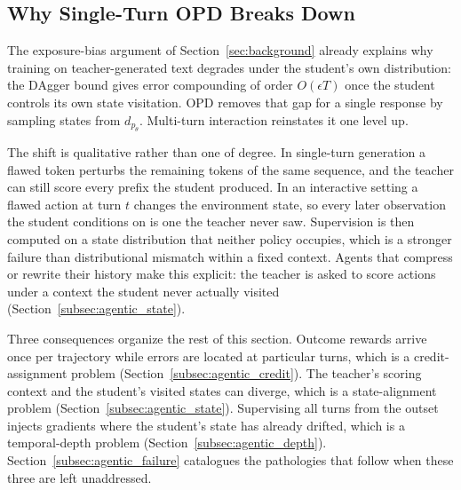 \documentclass{article} %
\newcommand{\ptheta}{p_\theta}
\begin{document}
\subsection{Why Single-Turn OPD Breaks Down}
\label{subsec:agentic_why}

The exposure-bias argument of Section~\ref{sec:background} already explains why training on teacher-generated text degrades under the student's own distribution: the DAgger bound gives error compounding of order $O(\epsilon T)$ once the student controls its own state visitation. OPD removes that gap for a single response by sampling states from $d_{\ptheta}$. Multi-turn interaction reinstates it one level up.

The shift is qualitative rather than one of degree. In single-turn generation a flawed token perturbs the remaining tokens of the same sequence, and the teacher can still score every prefix the student produced. In an interactive setting a flawed action at turn $t$ changes the environment state, so every later observation the student conditions on is one the teacher never saw. Supervision is then computed on a state distribution that neither policy occupies, which is a stronger failure than distributional mismatch within a fixed context. Agents that compress or rewrite their history make this explicit: the teacher is asked to score actions under a context the student never actually visited (Section~\ref{subsec:agentic_state}).

Three consequences organize the rest of this section. Outcome rewards arrive once per trajectory while errors are located at particular turns, which is a credit-assignment problem (Section~\ref{subsec:agentic_credit}). The teacher's scoring context and the student's visited states can diverge, which is a state-alignment problem (Section~\ref{subsec:agentic_state}). Supervising all turns from the outset injects gradients where the student's state has already drifted, which is a temporal-depth problem (Section~\ref{subsec:agentic_depth}). Section~\ref{subsec:agentic_failure} catalogues the pathologies that follow when these three are left unaddressed.
\end{document}
